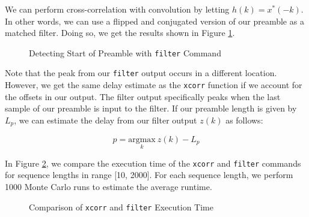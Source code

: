 \documentclass{article}
\begin{document}
\noindent We can perform cross-correlation with convolution by letting $h(k) = x^*(-k)$. In other words, we can use a flipped and conjugated version of our preamble as a matched filter. Doing so, we get the results shown in Figure \ref{fig::filter_preamble_detect}.

\begin{figure}[H]
	\centerline{}
	\caption{Detecting Start of Preamble with \texttt{filter} Command}
	\label{fig::filter_preamble_detect}
\end{figure}

\noindent Note that the peak from our \texttt{filter} output occurs in a different location. However, we get the same delay estimate as the \texttt{xcorr} function if we account for the offsets in our output. The filter output specifically peaks when the last sample of our preamble is input to the filter. If our preamble length is given by $L_p$, we can estimate the delay from our filter output $z(k)$ as follows:

\begin{equation}
	\hat{p} = \underset{k}{\text{argmax}}\ z(k) - L_p
\end{equation}

\noindent In Figure \ref{fig::execution_time}, we compare the execution time of the \texttt{xcorr} and \texttt{filter} commands for sequence lengths in range [10, 2000]. For each sequence length, we perform 1000 Monte Carlo runs to estimate the average runtime.
 
\begin{figure}[H]
	\centerline{}
	\caption{Comparison of \texttt{xcorr} and \texttt{filter} Execution Time}
	\label{fig::execution_time}
\end{figure}
\end{document}
